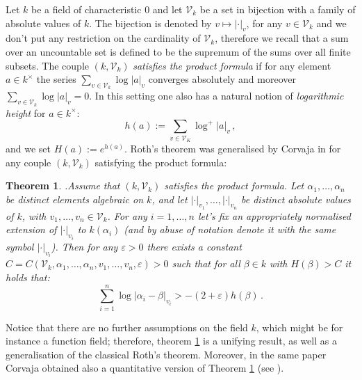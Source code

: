 \documentclass[10 pt,a4paper]{article}
\theoremstyle{plain}
\newtheorem{thm}{Theorem}[section]
\theoremstyle{definition}
\theoremstyle{named}
\begin{document}
Let $k$ be a field of characteristic $0$ and let $\mathcal V_k$ be a  set in bijection with a family of absolute values of $k$. The bijection is denoted by $v\mapsto |\cdot|_v$, for any $v\in\mathcal V_k$ and we don't put any restriction on the cardinality of $\mathcal V_k$, therefore we recall that a sum  over an uncountable  set  is defined to be the supremum of the sums over all finite subsets. The couple  $(k,\mathcal V_k)$ \emph{satisfies the product formula} if  for any element $a\in k^\times$ the series $\sum_{v\in\mathcal V_k} \log|a|_v$ converges absolutely and moreover $\sum_{v\in\mathcal V_k} \log|a|_v=0$. In this setting one also has a natural notion of \emph{logarithmic height} for $a\in k^\times$:
$$h(a):=\sum_{v\in\mathcal V_K}\log^+|a|_v\,,$$
and we set $H(a):=e^{h(a)}$.  Roth's theorem was generalised by Corvaja in  \cite{C}   for any couple $(k,\mathcal V_k)$ satisfying the product formula:
\begin{thm}\cite[Corollaire 1]{C}.\label{CorCorv}
Assume that $(k,\mathcal V_k)$ satisfies the product formula. Let $\alpha_1,\ldots,\alpha_n$ be distinct elements algebraic on $k$, and let $|\cdot|_{v_1},\ldots,|\cdot|_{v_n}$ be distinct absolute values of $k$, with $v_1,\ldots, v_n\in \mathcal V_k$. For any $i=1,\ldots,n$ let's fix an appropriately  normalised extension of  $|\cdot|_{v_i}$ to $k(\alpha_i)$ (and by abuse of notation denote it with the same symbol $|\cdot|_{v_i}$). Then for any  $\varepsilon>0$ there exists a constant $C=C(\mathcal V_k,\alpha_1,\ldots,\alpha_n, v_1,\ldots, v_n,\varepsilon)>0$ such that for all $\beta\in k$ with $H(\beta)>C$ it holds that:
$$\sum^n_{i=1}\log|\alpha_i-\beta|_{v_i}>-(2+\varepsilon)h(\beta)\,.$$
\end{thm}
Notice that there are no further assumptions on the field $k$, which might be for instance a function field; therefore, theorem \ref{CorCorv} is a unifying result, as well as a generalisation of the classical Roth's theorem. Moreover, in the same paper Corvaja obtained also a quantitative version of Theorem \ref{CorCorv} (see \cite[Corollaire 3.7]{C}). 
 
\end{document}
